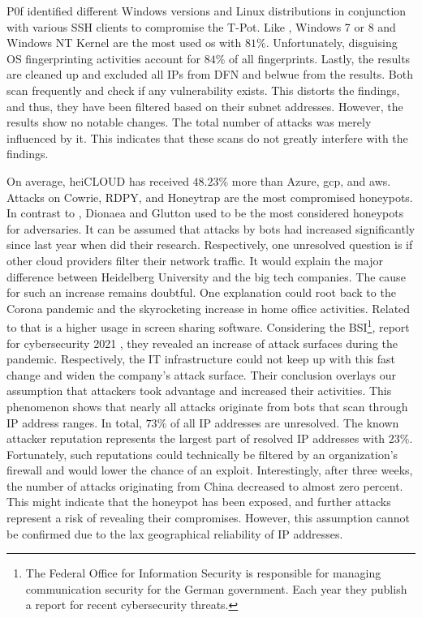 P0f identified different Windows versions and Linux distributions in conjunction with various SSH clients to compromise the T-Pot.
Like \citet{Kelly2021}, Windows 7 or 8 and Windows NT Kernel are the most used \ac{os} with $81\%$.
Unfortunately, disguising OS fingerprinting activities account for $84\%$ of all fingerprints.
Lastly, the results are cleaned up and excluded all IPs from DFN and \acs{belwue} from the results.
Both scan frequently and check if any vulnerability exists.
This distorts the findings, and thus, they have been filtered based on their subnet addresses.
However, the results show no notable changes.
The total number of attacks was merely influenced by it.
This indicates that these scans do not greatly interfere with the findings.

On average, heiCLOUD has received $48.23\%$ more than Azure, \ac{gcp}, and \ac{aws}.
Attacks on Cowrie, RDPY, and Honeytrap are the most compromised honeypots.
In contrast to \citet{Kelly2021}, Dionaea and Glutton used to be the most considered honeypots for adversaries.
It can be assumed that attacks by bots had increased significantly since last year when \citet{Kelly2021} did their research.
Respectively, one unresolved question is if other cloud providers filter their network traffic.
It would explain the major difference between Heidelberg University and the big tech companies.
The cause for such an increase remains doubtful.
One explanation could root back to the Corona pandemic and the skyrocketing increase in home office activities.
Related to that is a higher usage in screen sharing software.
Considering the BSI\footnote{The Federal Office for Information Security is responsible for managing communication security for the German government. Each year they publish a report for recent cybersecurity threats.}, report for cybersecurity 2021 \cite{bsi2021}, they revealed an increase of attack surfaces during the pandemic.
Respectively, the IT infrastructure could not keep up with this fast change and widen the company's attack surface.
Their conclusion overlays our assumption that attackers took advantage and increased their activities.
This phenomenon shows that nearly all attacks originate from bots that scan through IP address ranges.
In total, $73\%$ of all IP addresses are unresolved.
The known attacker reputation represents the largest part of resolved IP addresses with $23\%$.
Fortunately, such reputations could technically be filtered by an organization's firewall and would lower the chance of an exploit.
Interestingly, after three weeks, the number of attacks originating from China decreased to almost zero percent.
This might indicate that the honeypot has been exposed, and further attacks represent a risk of revealing their compromises.
However, this assumption cannot be confirmed due to the lax geographical reliability of IP addresses.

